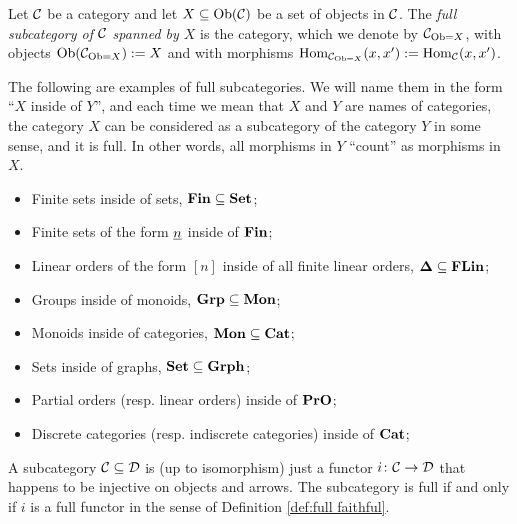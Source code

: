 \documentclass[CT4S-EN-RU]{subfiles}
\begin{document}
\begin{definitionENG}\label{def:full subcategory}
Let $\mathcal{C}$ be a category and let $X\subseteq\textnormal{Ob}(\mathcal{C})$ be a set of objects in $\mathcal{C}$. The {\em full subcategory of $\mathcal{C}$ spanned by $X$} is the category, which we denote by $\mathcal{C}_{\textnormal{Ob}=X}$, with objects $\textnormal{Ob}(\mathcal{C}_{\textnormal{Ob}=X}):=X$ and with morphisms $\textnormal{Hom}_{\mathcal{C}_{\textnormal{Ob}=X}}(x,x'):=\textnormal{Hom}_\mathcal{C}(x,x')$.
\end{definitionENG}

\begin{definitionRUS}\label{def:full subcategory}
\end{definitionRUS}

\begin{exampleENG}
The following are examples of full subcategories. We will name them in the form “$X$ inside of $Y$”, and each time we mean that $X$ and $Y$ are names of categories, the category $X$ can be considered as a subcategory of the category $Y$ in some sense, and it is full. In other words, all morphisms in $Y$ “count” as morphisms in $X$.
\begin{itemize}
\item Finite sets inside of sets, ${\mathbf{Fin}}\subseteq{\mathbf{Set}}$;
\item Finite sets of the form $\underline{n}$ inside of ${\mathbf{Fin}}$;
\item Linear orders of the form $[n]$ inside of all finite linear orders, ${\mathbf{\Delta}}\subseteq{\mathbf{FLin}}$;
\item Groups inside of monoids, ${\mathbf{Grp}}\subseteq{\mathbf{Mon}}$;
\item Monoids inside of categories, ${\mathbf{Mon}}\subseteq{\mathbf{Cat}}$;
\item Sets inside of graphs, ${\mathbf{Set}}\subseteq{\mathbf{Grph}}$;
\item Partial orders (resp. linear orders) inside of ${\mathbf{PrO}}$;
\item Discrete categories (resp. indiscrete categories) inside of ${\mathbf{Cat}}$;
\end{itemize}
\end{exampleENG}

\begin{exampleRUS}
\end{exampleRUS}

\begin{remarkENG}
A subcategory $\mathcal{C}\subseteq\mathcal{D}$ is (up to isomorphism) just a functor $i\colon\mathcal{C}\rightarrow\mathcal{D}$ that happens to be injective on objects and arrows. The subcategory is full if and only if $i$ is a full functor in the sense of Definition \ref{def:full faithful}.
\end{remarkENG}
\end{document}
